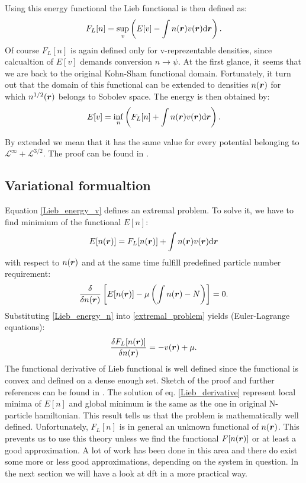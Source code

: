 \documentclass[openany, longbibliography,slovene,a4paper,12pt]{article}
\def\vec#1{\mbox{\boldmath$#1$}}
\newcommand{\dif}{\mathrm{d}}
\begin{document}
  Using this energy functional the Lieb functional is then defined as:
  \begin{equation}
    F_{L}[n] = \sup_{v} \left(  E[v] - \int n(\vec r) v(\vec r) \dif \vec r \right).
  \end{equation}
  Of course $F_{L}[n]$ is again defined only for v-reprezentable densities,
  since calcualtion of $E[v]$ demands conversion $n \rightarrow \psi$. At the
  first glance, it seems that we are back to the original Kohn-Sham functional
  domain. Fortunately, it turn out that the domain of this functional can be
  extended to densities $n(\vec r)$ for which $n^{1/2}(\vec r)$ belongs to
  Sobolev space. The energy is then obtained by:
  \begin{equation} \label{Lieb_energy_v}
    E[v]=\inf_n \left( F_L[n] + \int n(\vec r)v(\vec r)\dif \vec r   \right).
  \end{equation}
  
By extended we mean that it has the same value for every potential belonging to
$\mathcal{L}^{\infty}+ \mathcal{L}^{3/2} $. The proof can be found in \cite{advanced_course}.

  
\subsection{Variational formualtion}
Equation \ref{Lieb_energy_v} defines an extremal problem. To solve it, we have to
find minimium of the functional $E[n]$:
\begin{equation} \label{Lieb_energy_n}
 E[n(\vec r)] =  F_L[n(\vec r)] + \int n(\vec r)v(\vec r)\dif \vec r 
  \end{equation}
 with respect to $n(\vec r)$ and at the same time fulfill predefined particle
 number requirement:
\begin{equation} \label{extremal_problem}
  \frac{\delta }{\delta n(\vec r)} \left[  E[n(\vec r)] - \mu \left(  \int n(\vec r) -N \right)  \right] =0.
\end{equation}
Substituting \ref{Lieb_energy_n} into \ref{extremal_problem} yields
(Euler-Lagrange equations):
\begin{equation} \label{Lieb_derivative}
  \frac{\delta F_L[n(\vec r)]}{\delta n(\vec r)} = -v(\vec r) + \mu.
  \end{equation}
  The functional derivative of Lieb functional is well defined since the
  functional is convex and defined on a dense enough set. Sketch of the proof
  and further references can be found in \cite{advanced_course}. The solution of
  eq. \ref{Lieb_derivative} represent local minima of $E[n]$ and global minimum
  is the same as the one in original N-particle hamiltonian. This result tells
  us that the problem is mathematically well
  defined. Unfortunately, $F_L[n]$ is in general an unknown functional of
  $n(\vec r)$. This prevents us to use this theory unless we find the functional
  $F[n (\vec r)]$ or at least a good approximation. A lot of work has
  been done in this area and there do exist some more or less good approximations,
  depending on the system in question. In the next section we will have a look at dft in a more practical way.
\end{document}
